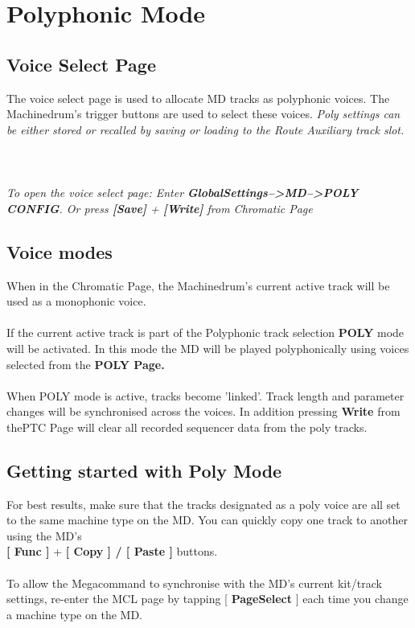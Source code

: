 \chapter{Polyphonic Mode}

\section{Voice Select Page}
The voice select page is used to allocate MD tracks as polyphonic voices.
The Machinedrum's trigger buttons are used to select these voices.
\textit{Poly settings can be either stored or recalled by saving or loading to the Route Auxiliary track slot.}\\\\
\\\\
\textit{To open the voice select page: Enter \textbf{GlobalSettings-->MD-->POLY CONFIG}. Or press \textbf{[Save]} + \textbf{[Write]} from  Chromatic Page}
\section{Voice modes}

When in the Chromatic Page, the Machinedrum's current active track will be used as a monophonic voice.\\
\\
If the current active track is part of the Polyphonic track selection \textbf{POLY} mode will be activated. In this mode the MD will be played polyphonically using voices selected from the \textbf{POLY Page.}\\
\\
When POLY mode is active, tracks become 'linked'. Track length and parameter changes will be synchronised across the voices. In addition pressing \textbf{Write} from thePTC Page will clear all recorded sequencer data from the poly tracks.
\section{Getting started with Poly Mode}
For best results, make sure that the tracks designated as a poly voice are all set to the same machine type on the MD. You can quickly copy one track to another using the MD's\\ \textbf{[ Func ]} + \textbf{[ Copy ] / [ Paste ]} buttons.\\\\
To allow the Megacommand to synchronise with the MD's current kit/track settings, re-enter the MCL page by tapping [ \textbf{PageSelect} ] each time you change a machine type on the MD.
\newpage
